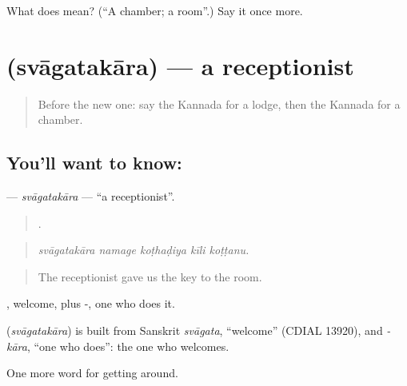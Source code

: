 \begin{tcolorbox}[breakable,colback=teal!4,colframe=teal!35!black,title={Before you move on}]
What does  mean? (\textquotedblleft{}A chamber; a room\textquotedblright{}.) Say it once more.
\end{tcolorbox}
\section[\texorpdfstring{\kn{ಸ್ವಾಗತಕಾರ} (svāgatakāra)}{ಸ್ವಾಗತಕಾರ (svāgatakāra)}]{ (svāgatakāra) — a receptionist}

\label{lesson:KA-C460-svagatakara}



\begin{quote}
Before the new one: say the Kannada for a lodge, then the Kannada for a chamber.
\end{quote}

\subsection*{You'll want to know: }
\textbf{} — \emph{svāgatakāra} — \textquotedblleft{}a receptionist\textquotedblright{}.

\begin{quote}
    .
\end{quote}

\begin{quote}
\emph{svāgatakāra namage koṭhaḍiya kīli koṭṭanu.}
\end{quote}

\begin{quote}
The receptionist gave us the key to the room.
\end{quote}

, welcome, plus -, one who does it.

\begin{cousinweb}
\textbf{} (\emph{svāgatakāra}) is built from Sanskrit \emph{svāgata}, \textquotedblleft{}welcome\textquotedblright{} (CDIAL 13920), and \emph{-kāra}, \textquotedblleft{}one who does\textquotedblright{}: the one who welcomes.
\end{cousinweb}

\begin{grammarlens}[title={What you've built}]
One more word for getting around.
\end{grammarlens}

